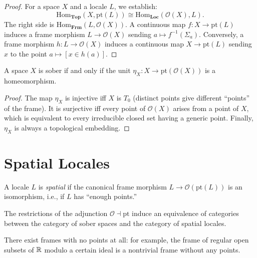 \begin{proof}
For a space $X$ and a locale $L$, we establish:
\[
  \mathrm{Hom}_{\mathbf{Top}}(X, \mathrm{pt}(L)) \cong
  \mathrm{Hom}_{\mathbf{Loc}}(\mathcal{O}(X), L).
\]
The right side is $\mathrm{Hom}_{\mathbf{Frm}}(L, \mathcal{O}(X))$. A continuous map
$f\colon X \to \mathrm{pt}(L)$ induces a frame morphism $L \to \mathcal{O}(X)$ sending
$a \mapsto f^{-1}(\Sigma_a)$. Conversely, a frame morphism $h\colon L \to \mathcal{O}(X)$
induces a continuous map $X \to \mathrm{pt}(L)$ sending $x$ to the point
$a \mapsto [x \in h(a)]$.
\end{proof}

\begin{theorem}
A space $X$ is sober if and only if the unit $\eta_X\colon X \to
\mathrm{pt}(\mathcal{O}(X))$ is a homeomorphism.
\end{theorem}

\begin{proof}
The map $\eta_X$ is injective iff $X$ is $T_0$ (distinct points give different ``points''
of the frame). It is surjective iff every point of $\mathcal{O}(X)$ arises from a point of
$X$, which is equivalent to every irreducible closed set having a generic point. Finally,
$\eta_X$ is always a topological embedding.
\end{proof}

\section{Spatial Locales}

\begin{definition}
A locale $L$ is \emph{spatial} if the canonical frame morphism
$L \to \mathcal{O}(\mathrm{pt}(L))$ is an isomorphism, i.e., if $L$ has ``enough points.''
\end{definition}

\begin{theorem}
The restrictions of the adjunction $\mathcal{O} \dashv \mathrm{pt}$ induce an equivalence
of categories between the category of sober spaces and the category of spatial locales.
\end{theorem}

\begin{proposition}
There exist frames with no points at all: for example, the frame of regular open subsets
of $\mathbb{R}$ modulo a certain ideal is a nontrivial frame without any points.
\end{proposition}

